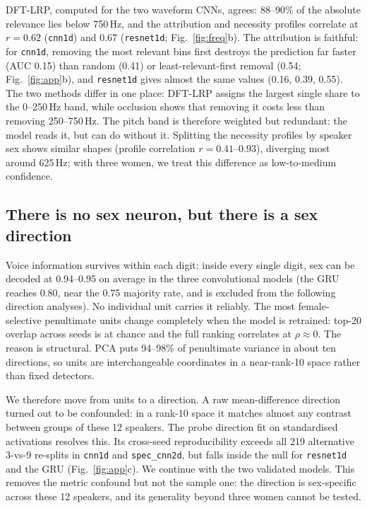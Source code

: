 \documentclass[conference]{IEEEtran}
\begin{document}
DFT-LRP, computed for the two waveform CNNs, agrees: 88--90\% of the
absolute relevance lies below 750\,Hz, and the attribution and necessity
profiles correlate at $r=0.62$ (\texttt{cnn1d}) and $0.67$
(\texttt{resnet1d}; Fig.~\ref{fig:freq}b). The attribution is faithful: for
\texttt{cnn1d}, removing the most relevant bins first destroys the prediction
far faster (AUC 0.15) than random (0.41) or least-relevant-first removal
(0.54; Fig.~\ref{fig:app}b), and \texttt{resnet1d} gives almost the same
values (0.16, 0.39, 0.55). The two methods differ in one place:
DFT-LRP assigns the largest single share to the 0--250\,Hz band, while
occlusion shows that removing it costs less than removing 250--750\,Hz. The
pitch band is therefore weighted but redundant: the model reads it, but can
do without it. Splitting the
necessity profiles by speaker sex shows similar shapes (profile correlation
$r=0.41$--$0.93$), diverging most around 625\,Hz; with three women, we treat
this difference as low-to-medium confidence.

\subsection{There is no sex neuron, but there is a sex direction}
Voice information survives within each digit: inside every single digit, sex
can be decoded at 0.94--0.95 on average in the three convolutional models
(the GRU reaches 0.80, near the 0.75 majority rate, and is excluded from the
following direction analyses). No individual unit carries it reliably. The
most female-selective penultimate units change completely when the model is
retrained: top-20 overlap across seeds is at chance and the full ranking
correlates at $\rho\approx0$. The reason is structural. PCA puts 94--98\% of
penultimate variance in about ten directions, so units are interchangeable
coordinates in a near-rank-10 space rather than fixed detectors.

We therefore move from units to a direction. A raw mean-difference
direction turned out to be confounded: in a rank-10 space it matches almost
any contrast between groups of these 12 speakers. The probe direction fit on
standardised activations resolves this. Its cross-seed reproducibility exceeds all 219
alternative 3-vs-9 re-splits in \texttt{cnn1d} and \texttt{spec\_cnn2d}, but
falls inside the null for \texttt{resnet1d} and the GRU (Fig.~\ref{fig:app}c).
We continue with the two validated models. This removes the metric
confound but not the sample one: the direction is sex-specific across these
12 speakers, and its generality beyond three women cannot be tested.
\end{document}
